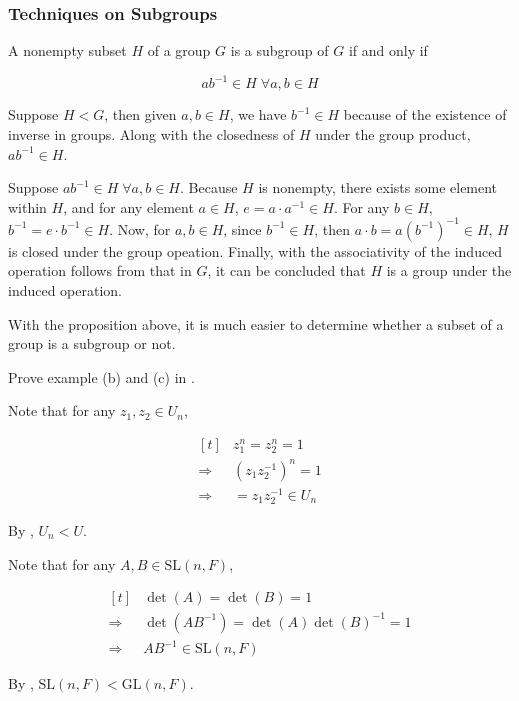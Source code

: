 \documentclass[a4paper,12pt]{article}
\begin{document}
\subsubsection{Techniques on Subgroups}
\begin{pst}
  A nonempty subset $H$ of a group $G$ is a subgroup of $G$ if and only if

  $$ab^{-1}\in H\;\forall a,b\in H$$\s

  \prf {} Suppose $H<G$, then given $a,b\in H$, we have $b^{-1}\in H$ because of the existence of inverse in groups. Along with the closedness of $H$ under the group product, $ab^{-1}\in H$.\n

   Suppose $ab^{-1}\in H\;\forall a,b\in H$. Because $H$ is nonempty, there exists some element within $H$, and for any element $a\in H$, $e=a\cdot a^{-1}\in H$. For any $b\in H$, $b^{-1}=e\cdot b^{-1}\in H$. Now, for $a,b\in H$, since $b^{-1}\in H$, then $a\cdot b=a(b^{-1})^{-1}\in H$, $H$ is closed under the group opeation. Finally, with the associativity of the induced operation follows from that in $G$, it can be concluded that $H$ is a group under the induced operation.
\end{pst}\n

With the proposition above, it is much easier to determine whether a subset of a group is a subgroup or not.

\begin{exm}
  Prove example (b) and (c) in \rexm[\sctr{5}].\n

  \ans {} Note that for any $z_{1},z_{2}\in U_{n}$,

  $$\begin{aligned}[t]
    &z_{1}^{n}=z_{2}^{n}=1\\
    \Rightarrow&(z_{1}z_{2}^{-1})^{n}=1\\
    \Rightarrow&=z_{1}z_{2}^{-1}\in U_{n}
  \end{aligned}$$\s

  By \rpst[\sctr{1}], $U_{n}<U$.\n

   Note that for any $A,B\in\mathrm{SL}(n,F)$,

  $$\begin{aligned}[t]
    &\det(A)=\det(B)=1\\
    \Rightarrow&\det(AB^{-1})=\det(A)\det(B)^{-1}=1\\
    \Rightarrow&AB^{-1}\in\mathrm{SL}(n,F)
  \end{aligned}$$\s

  By \rpst[\sctr{1}], $\mathrm{SL}(n,F)<\mathrm{GL}(n,F)$.
\end{exm}
\end{document}
